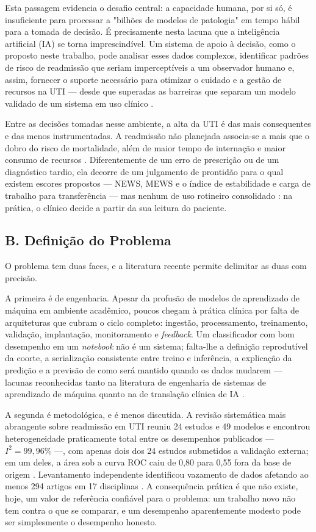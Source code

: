 \documentclass{ieeeaccess}
\begin{document}
\noindent %
Esta passagem evidencia o desafio central: a capacidade humana, por si só, é insuficiente para processar a "bilhões de modelos de patologia" em tempo hábil para a tomada de decisão. É precisamente nesta lacuna que a inteligência artificial (IA) se torna imprescindível. Um sistema de apoio à decisão, como o proposto neste trabalho, pode analisar esses dados complexos, identificar padrões de risco de readmissão que seriam imperceptíveis a um observador humano e, assim, fornecer o suporte necessário para otimizar o cuidado e a gestão de recursos na UTI --- desde que superadas as barreiras que separam um modelo validado de um sistema em uso clínico \cite{Kelly2019}.

Entre as decisões tomadas nesse ambiente, a alta da UTI é das mais consequentes e das menos instrumentadas. A readmissão não planejada associa-se a mais que o dobro do risco de mortalidade, além de maior tempo de internação e maior consumo de recursos \cite{Koumantakis2025}. Diferentemente de um erro de prescrição ou de um diagnóstico tardio, ela decorre de um julgamento de prontidão para o qual existem escores propostos --- NEWS, MEWS e o índice de estabilidade e carga de trabalho para transferência --- mas nenhum de uso rotineiro consolidado \cite{Badilla2025}: na prática, o clínico decide a partir da sua leitura do paciente.


\subsection*{B. Definição do Problema}
O problema tem duas faces, e a literatura recente permite delimitar as duas com precisão.

A primeira é de engenharia. Apesar da profusão de modelos de aprendizado de máquina em ambiente acadêmico, poucos chegam à prática clínica por falta de arquiteturas que cubram o ciclo completo: ingestão, processamento, treinamento, validação, implantação, monitoramento e \textit{feedback}. Um classificador com bom desempenho em um \textit{notebook} não é um sistema; falta-lhe a definição reprodutível da coorte, a serialização consistente entre treino e inferência, a explicação da predição e a previsão de como será mantido quando os dados mudarem --- lacunas reconhecidas tanto na literatura de engenharia de sistemas de aprendizado de máquina \cite{Sculley2015} quanto na de translação clínica de IA \cite{Kelly2019}.

A segunda é metodológica, e é menos discutida. A revisão sistemática mais abrangente sobre readmissão em UTI reuniu 24 estudos e 49 modelos e encontrou heterogeneidade praticamente total entre os desempenhos publicados --- $I^2 = 99{,}96\%$ ---, com apenas dois dos 24 estudos submetidos a validação externa; em um deles, a área sob a curva ROC caiu de 0,80 para 0,55 fora da base de origem \cite{Koumantakis2025}. Levantamento independente identificou vazamento de dados afetando ao menos 294 artigos em 17 disciplinas \cite{Kapoor2023}. A consequência prática é que não existe, hoje, um valor de referência confiável para o problema: um trabalho novo não tem contra o que se comparar, e um desempenho aparentemente modesto pode ser simplesmente o desempenho honesto.
\end{document}
